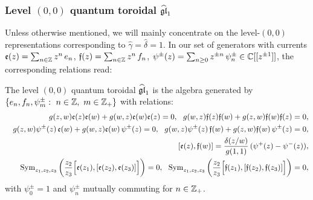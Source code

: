 \subsubsection{Level $(0,0)$ quantum toroidal $\widehat{{\mathfrak{gl}}}_1$}

Unless otherwise mentioned, we will mainly concentrate on the level-$(0,0)$ representations corresponding to 
$\hat \gamma=\hat \delta=1$. In our set of generators with currents
${\mathfrak e}(z)=\sum_{n\in {\mathbb Z}} z^n\, e_n$, ${\mathfrak f}(z)=\sum_{n\in {\mathbb Z}} z^n\, f_n$,
$\psi^\pm(z)=\sum_{n\geq 0} z^{\pm n}\, \psi^{\pm}_n\in {\mathbb C}[[z^{\pm 1}]]$, the corresponding relations read:

\begin{defn}\label{qtordef}
The level $(0,0)$ quantum toroidal $\widehat{{\mathfrak{gl}}}_1$ is the algebra generated by $\{ e_n,f_n, \psi^{\pm}_m: \ n\in {\mathbb Z}, \ m\in {\mathbb Z}_+\}$ with relations:
\begin{eqnarray*}
&&g(z,w){\mathfrak e}(z){\mathfrak e}(w)+g(w,z){\mathfrak e}(w){\mathfrak e}(z)=0, \ \ g(w,z){\mathfrak f}(z){\mathfrak f}(w)+g(z,w){\mathfrak f}(w){\mathfrak f}(z)=0, \\
&&g(z,w)\psi^\pm(z)\,{\mathfrak e}(w)+g(w,z){\mathfrak e}(w)\,\psi^\pm(z)=0, \ \ g(w,z)\psi^\pm(z)\,{\mathfrak f}(w)+g(z,w){\mathfrak f}(w)\,\psi^\pm(z)=0, \\
&&{[} {\mathfrak e}(z),{\mathfrak f}(w) {]}=\frac{\delta(z/w)}{g(1,1)}\, (\psi^+(z)-\psi^-(z)),\\
&&{\rm Sym}_{z_1,z_2,z_3}\left( \frac{z_2}{z_3} {\Big[}{\mathfrak e}(z_1),{[}{\mathfrak e}(z_2),{\mathfrak e}(z_3){]}{\Big]}\right)
=0 ,\ \ 
{\rm Sym}_{z_1,z_2,z_3}\left( \frac{z_2}{z_3} {\Big[}{\mathfrak f}(z_1),{[}{\mathfrak f}(z_2),{\mathfrak f}(z_3){]}{\Big]}\right)
=0 ,
\end{eqnarray*}
with $\psi_0^{\pm}=1$ and $\psi_{n}^{\pm}$ mutually commuting for $n\in {\mathbb Z}_+$.
\end{defn}


